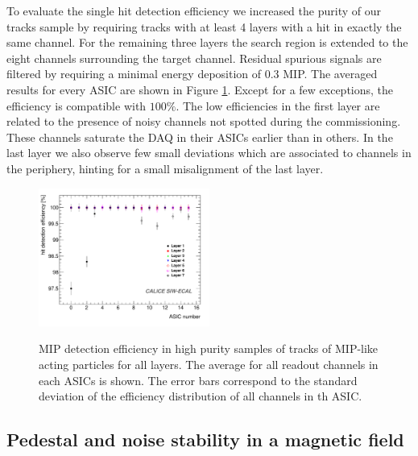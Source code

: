 \documentclass[final,3p,times,twocolumn]{elsarticle}
\begin{document}
To evaluate 
the single hit detection efficiency we increased the purity of our tracks sample
by requiring tracks with at least 4 layers with a hit in exactly the same channel.
For the remaining three layers the search region is extended to the eight channels
surrounding the target channel. Residual spurious signals are filtered by requiring a minimal energy deposition of 0.3 MIP.
The averaged results for every ASIC are shown in Figure \ref{efficiency}.
Except for a few exceptions, the efficiency is 
compatible with $100\%$.
The low efficiencies in the first layer are related to the presence of
noisy channels not spotted during the commissioning. These channels
saturate the DAQ in their ASICs earlier than in others.
In the last layer we also observe few small deviations
which are associated to channels in the periphery, hinting for a small misalignment of the last layer.

\begin{figure}[!t]
  \centering 
  \includegraphics[width=0.5\textwidth]{efficiency_nhits4_chips-eps-converted-to.pdf} \\
  \caption{MIP detection efficiency in high purity samples of tracks of MIP-like acting particles for all layers. The average for all readout channels in each ASICs is shown. The error bars correspond to the standard deviation of the efficiency distribution of all channels in th ASIC.}
\label{efficiency}
\end{figure}


\subsection{Pedestal and noise stability in a magnetic field}
\label{sec:magnetic}
\end{document}
